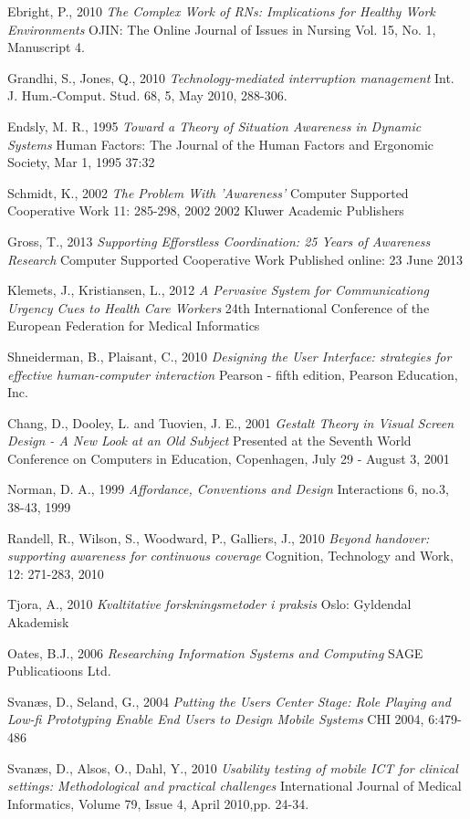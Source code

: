 \documentclass[b5paper, 11pt, norsk]{MScthesisITEM}
\begin{document}
\begin{thebibliography}{99}
Ebright, P., 2010
\emph {The Complex Work of RNs: Implications for Healthy Work Environments}
OJIN: The Online Journal of Issues in Nursing Vol. 15, No. 1, Manuscript 4.

Grandhi, S., Jones, Q., 2010
\emph {Technology-mediated interruption management} Int. J. Hum.-Comput. Stud. 68, 5, May 2010, 288-306.

Endsly, M. R., 1995
\emph{Toward a Theory of Situation Awareness in Dynamic Systems}
Human Factors: The Journal of the Human Factors and Ergonomic Society, Mar 1, 1995 37:32

Schmidt, K., 2002
\emph{The Problem With 'Awareness'}
Computer Supported Cooperative Work 11: 285-298, 2002
2002 Kluwer Academic Publishers

Gross, T., 2013
\emph{Supporting Efforstless Coordination: 25 Years of Awareness Research}
Computer Supported Cooperative Work
Published online: 23 June 2013

Klemets, J., Kristiansen, L., 2012
\emph{A Pervasive System for Communicationg Urgency Cues to Health Care Workers}
24th International Conference of the European Federation for Medical Informatics

Shneiderman, B., Plaisant, C., 2010
\emph{Designing the User Interface: strategies for effective human-computer interaction}
Pearson - fifth edition, Pearson Education, Inc.

Chang, D., Dooley, L. and Tuovien, J. E., 2001
\emph{Gestalt Theory in Visual Screen Design - A New Look at an Old Subject}
Presented at the Seventh World Conference on Computers in Education, Copenhagen, July 29 - August 3, 2001

Norman, D. A., 1999
\emph{Affordance, Conventions and Design}
Interactions 6, no.3, 38-43, 1999

Randell, R., Wilson, S., Woodward, P., Galliers, J., 2010
\emph{Beyond handover: supporting awareness for continuous coverage} 
Cognition, Technology and Work, 12: 271-283, 2010 

Tjora, A., 2010 
\emph{Kvaltitative forskningsmetoder i praksis} 
Oslo: Gyldendal Akademisk

Oates, B.J., 2006 
\emph{Researching Information Systems and Computing} 
SAGE Publicatioons Ltd.

Svanæs, D., Seland, G., 2004 
\emph{Putting the Users Center Stage: Role Playing and Low-fi Prototyping Enable End Users to Design Mobile Systems} 
CHI 2004, 6:479-486

Svanæs, D., Alsos, O., Dahl, Y., 2010
\emph{Usability testing of mobile ICT for clinical settings: Methodological and practical challenges}
International Journal of Medical Informatics, Volume 79, Issue 4, April 2010,pp. 24-34.

\end{thebibliography}

\end{document}
